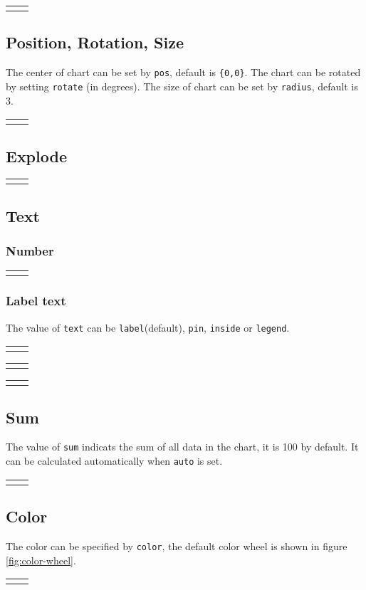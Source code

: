 \documentclass{article}
\newcommand{\demo}[2][1]{
  \begin{center}
  \begin{tabular}{cc}
    \begin{minipage}{.49\linewidth}
      \centering
      \resizebox{#1\linewidth}{!}{
        
      }
    \end{minipage}
    &
    \begin{minipage}{.45\linewidth}
      
    \end{minipage}
  \end{tabular}
  \end{center}
}
\begin{document}
\demo[0.6]{cloud}

\subsection{Position, Rotation, Size}

The center of chart can be set by \texttt{pos}, default is
\texttt{\{0,0\}}. The chart can be rotated by setting \texttt{rotate}
(in degrees). The size of chart can be set by \texttt{radius}, default
is 3.

\demo{radius}

\subsection{Explode}
\demo{explode}

\subsection{Text}

\subsubsection{Number}
\demo[0.6]{before-after-number}

\subsubsection{Label text}
The value of \texttt{text} can be \texttt{label}(default),
\texttt{pin}, \texttt{inside} or \texttt{legend}.

\demo[0.6]{text}

\demo[0.5]{text-inside}

\demo[0.6]{legend}

\subsection{Sum}
The value of \texttt{sum} indicats the sum of all data in the chart,
it is 100 by default. It can be calculated automatically when
\texttt{auto} is set.

\demo{sum}

\subsection{Color}
The color can be specified by \texttt{color}, the default color wheel
is shown in figure \ref{fig:color-wheel}.

\demo{color}
\end{document}

